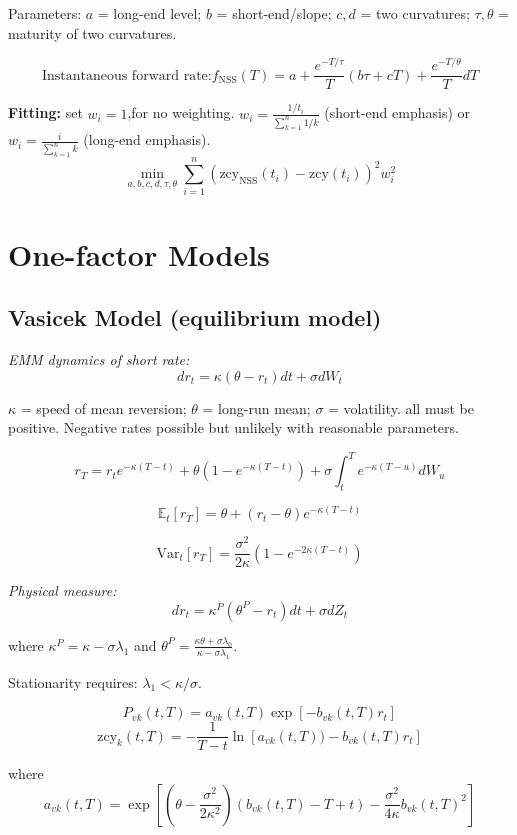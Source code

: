 \documentclass[12pt,a4paper]{article}
\begin{document}
Parameters: $a$ = long-end level; $b$ = short-end/slope; $c, d$ = two curvatures; $\tau, \theta$ = maturity of two curvatures.

$$\text{Instantaneous forward rate:} f_{\text{NSS}}(T) = a + \frac{e^{-T/\tau}}{T}(b\tau + cT) + \frac{e^{-T/\theta}}{T}dT$$

\textbf{Fitting:} set  $w_i= 1$,for no weighting. $w_i = \frac{1/t_i}{\sum_{k=1}^{n} 1/k}$ (short-end emphasis) or $w_i = \frac{i}{\sum_{k=1}^{n} k}$ (long-end emphasis).
$$\min_{a,b,c,d,\tau,\theta} \sum_{i=1}^{n} (\text{zcy}_{\text{NSS}}(t_i) - \text{zcy}(t_i))^2 w_i^2$$








\section{One-factor Models}

\subsection{Vasicek Model (equilibrium model)}

\textit{EMM dynamics of short rate:}
$$dr_t = \kappa(\theta - r_t)dt + \sigma dW_t$$

$\kappa$ = speed of mean reversion; $\theta$ = long-run mean; $\sigma$ = volatility. all must be positive.
Negative rates possible but unlikely with reasonable parameters.

$$r_T = r_t e^{-\kappa(T-t)} + \theta(1 - e^{-\kappa(T-t)}) + \sigma \int_t^T e^{-\kappa(T-u)} dW_u$$

$$\mathbb{E}_t[r_T] = \theta + (r_t - \theta)e^{-\kappa(T-t)}$$

$$\text{Var}_t[r_T] = \frac{\sigma^2}{2\kappa}(1 - e^{-2\kappa(T-t)})$$

\textit{Physical measure:} 
$$dr_t = \kappa^P(\theta^P - r_t)dt + \sigma dZ_t$$

where $\kappa^P = \kappa - \sigma\lambda_1$ and $\theta^P = \frac{\kappa\theta + \sigma\lambda_0}{\kappa - \sigma\lambda_1}$.

Stationarity requires: $\lambda_1 < \kappa/\sigma$.

$$P_{vk}(t,T) = a_{vk}(t,T)\exp[-b_{vk}(t,T)r_t]$$
$$\text{zcy}_k(t,T) = -\frac{1}{T-t}\ln[a_{vk}(t,T)) - b_{vk}(t,T)r_t]$$

where 
$$a_{vk}(t,T) = \exp\left[\left(\theta - \frac{\sigma^2}{2\kappa^2}\right)(b_{vk}(t,T) - T + t) - \frac{\sigma^2}{4\kappa}b_{vk}(t,T)^2\right]$$
\end{document}
